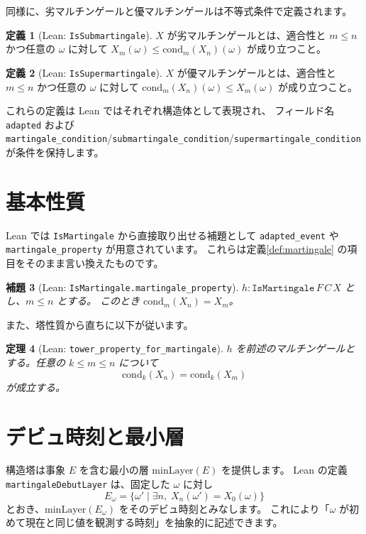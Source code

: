\documentclass[12pt]{ltjsarticle}
\theoremstyle{definition}
\newtheorem{definition}{定義}[section]
\theoremstyle{plain}
\newtheorem{theorem}[definition]{定理}
\newtheorem{lemma}[definition]{補題}
\begin{document}
同様に、劣マルチンゲールと優マルチンゲールは不等式条件で定義されます。

\begin{definition}[Lean: \texttt{IsSubmartingale}]
  $X$ が劣マルチンゲールとは、適合性と
  $m\le n$ かつ任意の $\omega$ に対して
  $X_m(\omega)\le \mathrm{cond}_m(X_n)(\omega)$ が成り立つこと。
\end{definition}

\begin{definition}[Lean: \texttt{IsSupermartingale}]
  $X$ が優マルチンゲールとは、適合性と
  $m\le n$ かつ任意の $\omega$ に対して
  $\mathrm{cond}_m(X_n)(\omega)\le X_m(\omega)$ が成り立つこと。
\end{definition}

これらの定義は Lean ではそれぞれ構造体として表現され、
フィールド名 \texttt{adapted} および
\texttt{martingale\_condition}/\texttt{submartingale\_condition}/\texttt{supermartingale\_condition} が条件を保持します。

\section{基本性質}

Lean では \texttt{IsMartingale} から直接取り出せる補題として
\texttt{adapted\_event} や \texttt{martingale\_property} が用意されています。
これらは定義\ref{def:martingale} の項目をそのまま言い換えたものです。

\begin{lemma}[Lean: \texttt{IsMartingale.martingale\_property}]
  $h:\texttt{IsMartingale}\,F\,C\,X$ とし、$m\le n$ とする。
  このとき $\mathrm{cond}_m(X_n)=X_m$。
\end{lemma}

また、塔性質から直ちに以下が従います。

\begin{theorem}[Lean: \texttt{tower\_property\_for\_martingale}]
  $h$ を前述のマルチンゲールとする。任意の $k\le m\le n$ について
  \[
    \mathrm{cond}_k(X_n)=\mathrm{cond}_k(X_m)
  \]
  が成立する。
\end{theorem}

\section{デビュ時刻と最小層}

構造塔は事象 $E$ を含む最小の層 $\mathrm{minLayer}(E)$ を提供します。
Lean の定義 \texttt{martingaleDebutLayer} は、固定した $\omega$ に対し
\[
  E_\omega = \{\omega'\mid \exists n,\; X_n(\omega') = X_0(\omega)\}
\]
とおき、$\mathrm{minLayer}(E_\omega)$ をそのデビュ時刻とみなします。
これにより「$\omega$ が初めて現在と同じ値を観測する時刻」を抽象的に記述できます。
\end{document}
